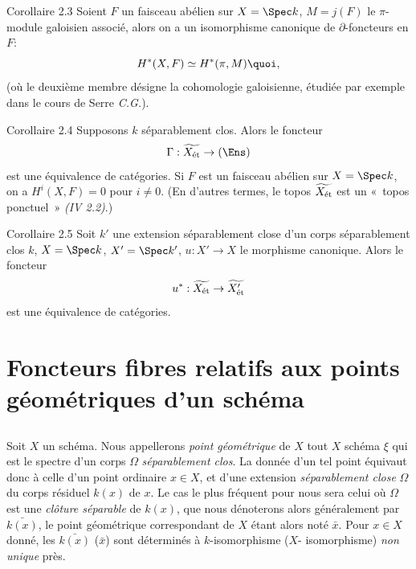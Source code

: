 \documentclass[10pt]{../fichiers-configuration-latex/smfart}
\begin{document}
\begin{enonce*}{Corollaire 2.3}
Soient $F$ un faisceau abélien sur $X = \Spec k$, $M = j(F)$ le
$\pi$-module galoisien associé, alors on a un isomorphisme canonique
de $\partial$-foncteurs en $F$:
$$
H^{\ast} (X, F) \simeq H^{\ast} (\pi, M){\quoi},
$$
(où le deuxième membre désigne la cohomologie galoisienne,
étudiée par
exemple dans le cours de Serre \emph{C.G.}).
\end{enonce*}

\begin{enonce*}{Corollaire 2.4}
Supposons $k$ séparablement clos. Alors le foncteur
$$
\Gamma : \widetilde{X_{\text{\rm ét}}} \to (\Ens)
$$
est une équivalence de catégories. Si $F$ est un faisceau abélien sur
$X = \Spec k$, on a $H^{i}(X, F) = 0$ pour $i \neq 0$. (En d'autres
termes, le topos $\widetilde{X_{\text{\rm ét}}}$ est un « topos
ponctuel » \emph{(IV 2.2)}.)
\end{enonce*}

\begin{enonce*}{Corollaire 2.5}
Soit $k'$ une extension séparablement close d'un corps séparablement
clos $k$, $X = \Spec k$, $X' = \Spec k'$, $u : X'\to X$ le morphisme
canonique. Alors le foncteur
$$
u^{\ast} : \widetilde{X_{\text{\rm ét}}} \to \widetilde{X'_{\text{\rm ét}}}
$$
est une équivalence de catégories.
\end{enonce*}

\section{Foncteurs fibres relatifs aux points géométriques d'un
  schéma}\pageoriginale

\subsection{}

Soit $X$ un schéma. Nous appellerons \emph{point géométrique} de $X$
tout $X$ schéma $\xi$ qui est le spectre d'un corps $\Omega$
\emph{séparablement clos}. La donnée d'un tel point équivaut donc à
celle d'un point ordinaire $x \in X$, et d'une extension
\emph{séparablement close} $\Omega$ du corps résiduel $k(x)$ de $x$.
Le cas le plus fréquent pour nous sera celui où $\Omega$ est une
\emph{clôture séparable} de $k(x)$, que nous dénoterons alors
généralement par $\bar{k(x)}$, le point géométrique correspondant de
$X$ étant alors noté $\bar{x}$. Pour $x \in X$ donné, les
$\bar{k(x)}$ (\resp $\bar{x}$) sont déterminés à $k$-isomorphisme
(\resp $X$- isomorphisme) \emph{non unique} près.
\end{document}
